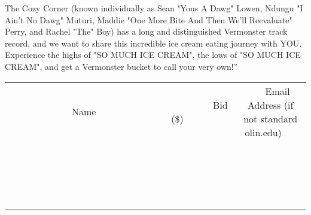 \documentclass[11pt]{article}
\begin{document}
The Cozy Corner (known individually as Sean "Yous A Dawg" Lowen, Ndungu "I Ain't No Dawg" Muturi, Maddie "One More Bite And Then We'll Reevaluate" Perry, and Rachel "The" Boy) has a long and distinguished Vermonster track record, and we want to share this incredible ice cream eating journey with YOU. Experience the highs of "SO MUCH ICE CREAM", the lows of "SO MUCH ICE CREAM", and get a Vermonster bucket to call your very own!”
\\[3ex]
\begin{tabular}{c c c}
~~~~~~~~~~~~~Name~~~~~~~~~~~~~ & ~~~~~~~~~Bid (\$)~~~~~~~~~  & ~~~Email Address (if not standard olin.edu)~~~\\
 & & \\
\hline
 & & \\
\hline
 & & \\
\hline
 & & \\
\hline
 & & \\
\hline
 & & \\
\hline
 & & \\
\hline
 & & \\
\hline
 & & \\
\hline
 & & \\
\hline
 & & \\
\hline
 & & \\
\hline
 & & \\
\hline
 & & \\
\hline
 & & \\
\hline
 & & \\
\hline
 & & \\
\hline
 & & \\
\hline
 & & \\
\hline
\end{tabular}
\newpage
\end{document}

